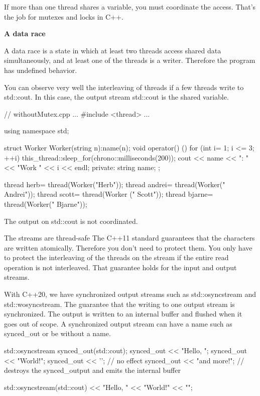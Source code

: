 If more than one thread shares a variable, you must coordinate the access. That’s the job for mutexes and locks in C++.


\noindent
\textbf{A data race}

A data race is a state in which at least two threads access shared data simultaneously, and at least one of the threads is a writer. Therefore the program has undefined behavior.

You can observe very well the interleaving of threads if a few threads write to std::cout. In this case, the output stream std::cout is the shared variable.


\begin{cpp}
// withoutMutex.cpp
...
#include <thread>
...

using namespace std;

struct Worker{
	Worker(string n):name(n){};
	void operator() (){
		for (int i= 1; i <= 3; ++i){
			this_thread::sleep_for(chrono::milliseconds(200));
			cout << name << ": " << "Work " << i << endl;
		}
	}
	private:
	string name;
};

thread herb= thread(Worker("Herb"));
thread andrei= thread(Worker(" Andrei"));
thread scott= thread(Worker ("     Scott"));
thread bjarne= thread(Worker("       Bjarne"));
\end{cpp}


The output on std::cout is not coordinated.

\begin{myTip}{The streams are thread-safe}
The C++11 standard guarantees that the characters are written atomically. Therefore you don’t need to protect them. You only have to protect the interleaving of the threads on the stream if the entire read operation is not interleaved. That guarantee holds for the input and output streams.

With C++20, we have synchronized output streams such as std::osyncstream and std::wosyncstream. The guarantee that the writing to one output stream is synchronized. The output is written to an internal buffer and flushed when it goes out of scope. A synchronized output stream can have a name such as synced\_out or be without a name.


\begin{cpp}
{
	std::osyncstream synced_out(std::cout);
	synced_out << "Hello, ";
	synced_out << "World!";
	synced_out << '\n'; // no effect
	synced_out << "and more!\n";
} // destroys the synced_output and emits the internal buffer

std::osyncstream(std::cout) << "Hello, " << "World!" << "\n";
\end{cpp}
\end{myTip}

